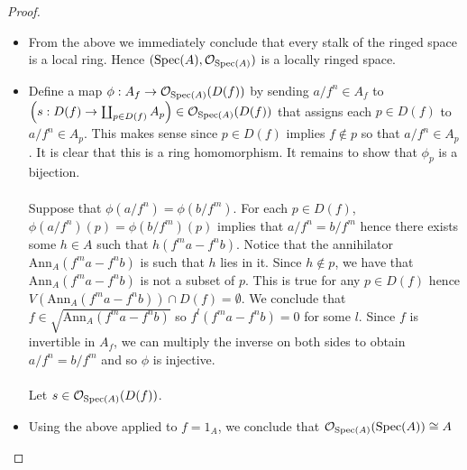 \documentclass[a4paper]{article}
\begin{document}
\begin{prp}{}{}
\begin{proof}
\begin{itemize}
\item From the above we immediately conclude that every stalk of the ringed space is a local ring. Hence $(\text{Spec}(A),\mathcal{O}_{\text{Spec}(A)})$ is a locally ringed space. 

\item Define a map $\phi:A_f\to\mathcal{O}_{\text{Spec}(A)}(D(f))$ by sending $a/f^n\in A_f$ to $\left(s:D(f)\to\coprod_{p\in D(f)}A_p\right)\in\mathcal{O}_{\text{Spec}(A)}(D(f))$ that assigns each $p\in D(f)$ to $a/f^n\in A_p$. This makes sense since $p\in D(f)$ implies $f\notin p$ so that $a/f^n\in A_p$. It is clear that this is a ring homomorphism. It remains to show that $\phi_p$ is a bijection. \\~\\

Suppose that $\phi(a/f^n)=\phi(b/f^m)$. For each $p\in D(f)$, $\phi(a/f^n)(p)=\phi(b/f^m)(p)$ implies that $a/f^n=b/f^m$ hence there exists some $h\in A$ such that $h(f^ma-f^nb)$. Notice that the annihilator $\text{Ann}_A(f^ma-f^nb)$ is such that $h$ lies in it. Since $h\notin p$, we have that $\text{Ann}_A(f^ma-f^nb)$ is not a subset of $p$. This is true for any $p\in D(f)$ hence $V(\text{Ann}_A(f^ma-f^nb))\cap D(f)=\emptyset$. We conclude that $f\in\sqrt{\text{Ann}_A(f^ma-f^nb)}$ so $f^l(f^ma-f^nb)=0$ for some $l$. Since $f$ is invertible in $A_f$, we can multiply the inverse on both sides to obtain $a/f^n=b/f^m$ and so $\phi$ is injective. \\~\\

Let $s\in\mathcal{O}_{\text{Spec}(A)}(D(f))$. 

\item Using the above applied to $f=1_A$, we conclude that $\mathcal{O}_{\text{Spec}(A)}(\text{Spec}(A))\cong A$
\end{itemize}
\end{proof}
\end{prp}
\end{document}
